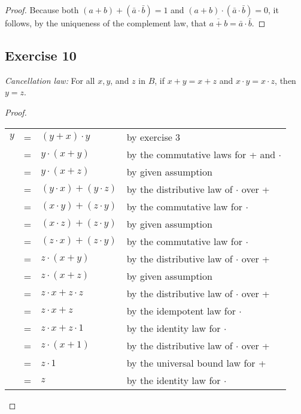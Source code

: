 \documentclass[14pt]{extarticle}
\newcommand{\cy}{\color{cyan}}
\begin{document}
\begin{proof}
  Because both \((a + b) + (\bar{a} \cdot \bar{b}) = 1\) and \((a + b) \cdot (\bar{a} \cdot \bar{b}) = 0\), it follows,
  by the uniqueness of the complement law, that \(\overline{a + b} = \bar{a} \cdot \bar{b}\).
\end{proof}

\subsection{Exercise 10}
{\it Cancellation law:} For all $x, y$, and $z$ in $B$, if \(x + y = x + z\) and \(x \cdot y = x \cdot z\), then \(y = z\).

\begin{proof}
  \begin{center}
    \begin{tabular}{rcll}
      $y$ & = & \((y + x) \cdot y\)           & {\cy by exercise 3}                             \\
          & = & \(y \cdot (x + y)\)           & {\cy by the commutative laws for + and $\cdot$} \\
          & = & \(y \cdot (x + z)\)           & {\cy by given assumption}                       \\
          & = & \((y \cdot x) + (y \cdot z)\) & {\cy by the distributive law of $\cdot$ over +} \\
          & = & \((x \cdot y) + (z \cdot y)\) & {\cy by the commutative law for $\cdot$}        \\
          & = & \((x \cdot z) + (z \cdot y)\) & {\cy by given assumption}                       \\
          & = & \((z \cdot x) + (z \cdot y)\) & {\cy by the commutative law for $\cdot$}        \\
          & = & \(z \cdot (x + y)\)           & {\cy by the distributive law of $\cdot$ over +} \\
          & = & \(z \cdot (x + z)\)           & {\cy by given assumption}                       \\
          & = & \(z \cdot x + z \cdot z\)     & {\cy by the distributive law of $\cdot$ over +} \\
          & = & \(z \cdot x + z\)             & {\cy by the idempotent law for $\cdot$}         \\
          & = & \(z \cdot x + z \cdot 1\)     & {\cy by the identity law for $\cdot$}           \\
          & = & \(z \cdot (x + 1)\)           & {\cy by the distributive law of $\cdot$ over +} \\
          & = & \(z \cdot 1\)                 & {\cy by the universal bound law for +}          \\
          & = & \(z\)                         & {\cy by the identity law for $\cdot$}
    \end{tabular}
  \end{center}
\end{proof}
\end{document}

